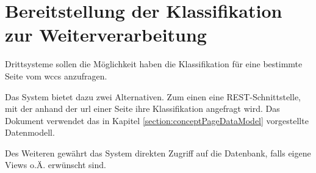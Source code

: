 \section{Bereitstellung der Klassifikation zur Weiterverarbeitung}
    Drittsysteme sollen die Möglichkeit haben die Klassifikation für eine bestimmte Seite
    vom \gls{wccs} anzufragen.

    Das System bietet dazu zwei Alternativen.
    Zum einen eine REST-Schnittstelle, mit der anhand der \gls{url} einer Seite
    ihre Klassifikation angefragt wird.
    Das Dokument verwendet das in Kapitel \ref{section:conceptPageDataModel}
    vorgestellte Datenmodell.

    Des Weiteren gewährt das System direkten Zugriff auf die Datenbank,
    falls eigene Views o.Ä. erwünscht sind.